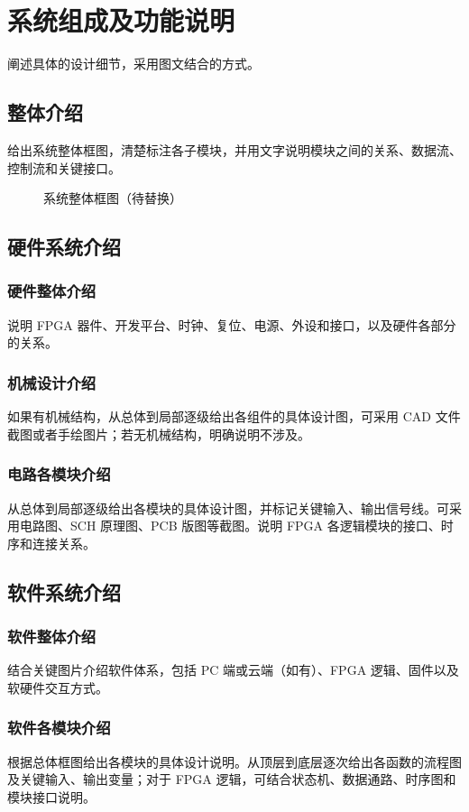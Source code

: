 ﻿\chapter{系统组成及功能说明}
阐述具体的设计细节，采用图文结合的方式。
\section{整体介绍}
给出系统整体框图，清楚标注各子模块，并用文字说明模块之间的关系、数据流、控制流和关键接口。
\begin{figure}[htbp]
\centering
{}
\caption{系统整体框图（待替换）}
\label{fig:system}
\end{figure}
\section{硬件系统介绍}
\subsection{硬件整体介绍}
说明 FPGA 器件、开发平台、时钟、复位、电源、外设和接口，以及硬件各部分的关系。
\subsection{机械设计介绍}
如果有机械结构，从总体到局部逐级给出各组件的具体设计图，可采用 CAD 文件截图或者手绘图片；若无机械结构，明确说明不涉及。
\subsection{电路各模块介绍}
从总体到局部逐级给出各模块的具体设计图，并标记关键输入、输出信号线。可采用电路图、SCH 原理图、PCB 版图等截图。说明 FPGA 各逻辑模块的接口、时序和连接关系。
\section{软件系统介绍}
\subsection{软件整体介绍}
结合关键图片介绍软件体系，包括 PC 端或云端（如有）、FPGA 逻辑、固件以及软硬件交互方式。
\subsection{软件各模块介绍}
根据总体框图给出各模块的具体设计说明。从顶层到底层逐次给出各函数的流程图及关键输入、输出变量；对于 FPGA 逻辑，可结合状态机、数据通路、时序图和模块接口说明。
